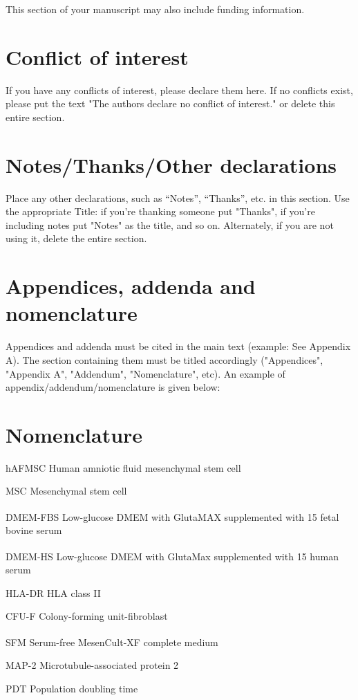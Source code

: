 \documentclass[numbers,sort&compress]{IntechOpen-Book}%
\begin{document}
\begin{backmatter}
This section of your manuscript may also include funding information.

\section*{Conflict of interest}
If you have any conflicts of interest, please declare them here. If no conflicts exist, please put the text "The authors declare no conflict of interest." or delete this entire section.

\section*{Notes/Thanks/Other declarations}
Place any other declarations, such as “Notes”, “Thanks”, etc. in this section. Use the appropriate Title: if you're thanking someone put "Thanks", if you're including notes put "Notes" as the title, and so on. Alternately, if you are not using it, delete the entire section.

\section*{Appendices, addenda and nomenclature}
Appendices and addenda must be cited in the main text (example: See Appendix A). The section containing them must be titled accordingly ("Appendices", "Appendix A", "Addendum", "Nomenclature", etc). An example of appendix/addendum/nomenclature is given below:

\section*{Nomenclature}

\begin{abbrvlist}
	\item[hAFMSC] Human amniotic fluid mesenchymal stem cell
	\item[MSC] Mesenchymal stem cell
	\item[DMEM-FBS] Low-glucose DMEM with GlutaMAX\textsuperscript{\texttrademark} supplemented with 15%
	fetal bovine serum
	\item[DMEM-HS] Low-glucose DMEM with GlutaMax\textsuperscript{\texttrademark} supplemented with 15%
	human serum
	\item[HLA-DR] HLA class II
	\item[CFU-F] Colony-forming unit-fibroblast
	\item[SFM] Serum-free MesenCult\textsuperscript{\texttrademark}-XF complete medium
	\item[MAP-2] Microtubule-associated protein 2
	\item[PDT] Population doubling time
\end{abbrvlist}


\end{backmatter}
\end{document}
